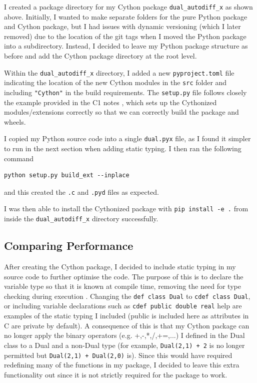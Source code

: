 \documentclass{article}
\begin{document}
I created a package directory for my Cython package \texttt{dual\_autodiff\_x} as shown above. Initially, I wanted to make separate folders for the pure Python package and Cython package, but I had issues with dynamic versioning (which I later removed) due to the location of the git tags when I moved the Python package into a subdirectory. Instead, I decided to leave my Python package structure as before and add the Cython package directory at the root level. 

Within the \texttt{dual\_autodiff\_x} directory, I added a new \texttt{pyproject.toml} file indicating the location of the new Cython modules in the \texttt{src} folder and including \texttt{"Cython"} in the build requirements. The \texttt{setup.py} file follows closely the example provided in the C1 notes \cite{research_computing_docs}, which sets up the Cythonized modules/extensions correctly so that we can correctly build the package and wheels.

I copied my Python source code into a single \texttt{dual.pyx} file, as I found it simpler to run in the next section when adding static typing. I then ran the following command
\begin{lstlisting}[style=mypythonstyle]
    python setup.py build_ext --inplace
\end{lstlisting}
and this created the \texttt{.c} and \texttt{.pyd} files as expected. 

I was then able to install the Cythonized package with \texttt{pip install -e .} from inside the \texttt{dual\_autodiff\_x} directory successfully.

\subsection{ Comparing Performance }

After creating the Cython package, I decided to include static typing in my source code to further optimise the code. The purpose of this is to declare the variable type so that it is known at compile time, removing the need for type checking during execution \cite{research_computing_docs}. Changing the \texttt{def class Dual} to \texttt{cdef class Dual}, or including variable declarations such as \texttt{cdef public double real} help are examples of the static typing I included (public is included here as attributes in C are private by default). A consequence of this is that my Cython package can no longer apply the binary operators (e.g. +,-,*,/,+=,...) I defined in the Dual class to a Dual and a non-Dual type (for example, \texttt{Dual(2,1) + 2} is no longer permitted but \texttt{Dual(2,1) + Dual(2,0)} is). Since this would have required redefining many of the functions in my package, I decided to leave this extra functionality out since it is not strictly required for the package to work. 
\end{document}
